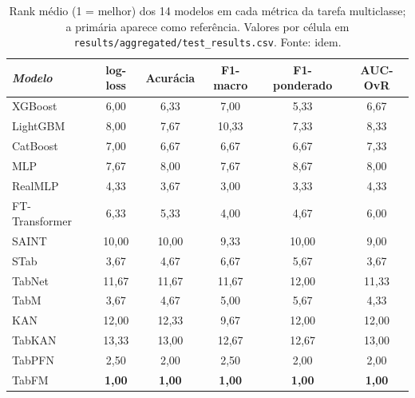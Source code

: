 \begin{table}[htbp]
\centering
\small
\caption[Métricas secundárias --- tarefa multiclasse]{Rank médio (1 = melhor) dos 14 modelos em cada métrica da tarefa multiclasse; a primária aparece como referência. Valores por célula em \texttt{results/\allowbreak aggregated/\allowbreak test\_\allowbreak results.\allowbreak csv}. Fonte: idem.}
\label{tab:app-secundarias-multiclass}
\begin{tabular}{lccccc}
\toprule
\emph{Modelo} & log-loss & Acurácia & F1-macro & F1-ponderado & AUC-OvR \\
\midrule
XGBoost & 6{,}00 & 6{,}33 & 7{,}00 & 5{,}33 & 6{,}67 \\
LightGBM & 8{,}00 & 7{,}67 & 10{,}33 & 7{,}33 & 8{,}33 \\
CatBoost & 7{,}00 & 6{,}67 & 6{,}67 & 6{,}67 & 7{,}33 \\
MLP & 7{,}67 & 8{,}00 & 7{,}67 & 8{,}67 & 8{,}00 \\
RealMLP & 4{,}33 & 3{,}67 & 3{,}00 & 3{,}33 & 4{,}33 \\
FT-Transformer & 6{,}33 & 5{,}33 & 4{,}00 & 4{,}67 & 6{,}00 \\
SAINT & 10{,}00 & 10{,}00 & 9{,}33 & 10{,}00 & 9{,}00 \\
STab & 3{,}67 & 4{,}67 & 6{,}67 & 5{,}67 & 3{,}67 \\
TabNet & 11{,}67 & 11{,}67 & 11{,}67 & 12{,}00 & 11{,}33 \\
TabM & 3{,}67 & 4{,}67 & 5{,}00 & 5{,}67 & 4{,}33 \\
KAN & 12{,}00 & 12{,}33 & 9{,}67 & 12{,}00 & 12{,}00 \\
TabKAN & 13{,}33 & 13{,}00 & 12{,}67 & 12{,}67 & 13{,}00 \\
TabPFN & 2{,}50 & 2{,}00 & 2{,}50 & 2{,}00 & 2{,}00 \\
TabFM & \textbf{1{,}00} & \textbf{1{,}00} & \textbf{1{,}00} & \textbf{1{,}00} & \textbf{1{,}00} \\
\bottomrule
\end{tabular}
\end{table}

